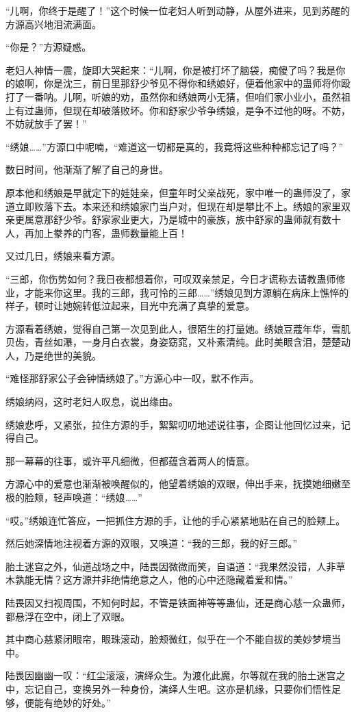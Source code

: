 \begin{this_body}
“儿啊，你终于是醒了！”这个时候一位老妇人听到动静，从屋外进来，见到苏醒的方源高兴地泪流满面。

“你是？”方源疑惑。

老妇人神情一震，旋即大哭起来：“儿啊，你是被打坏了脑袋，痴傻了吗？我是你的娘啊，你是沈三，前日里那舒少爷见不得你和绣娘好，便着他家中的蛊师将你殴打了一番呐。儿啊，听娘的劝，虽然你和绣娘两小无猜，但咱们家小业小，虽然祖上有过蛊师，但现在却破落败坏。你和舒家少爷争绣娘，是争不过他的呀。不妨，不妨就放手了罢！”

“绣娘……”方源口中呢喃，“难道这一切都是真的，我竟将这些种种都忘记了吗？”

数日时间，他渐渐了解了自己的身世。

原本他和绣娘是早就定下的娃娃亲，但童年时父亲战死，家中唯一的蛊师没了，家道立即败落下去。本来还和绣娘家门当户对，但现在却是攀比不上。绣娘的家里双亲更属意那舒少爷。舒家家业更大，乃是城中的豪族，族中舒家的蛊师就有数十人，再加上豢养的门客，蛊师数量能上百！

又过几日，绣娘来看方源。

“三郎，你伤势如何？我日夜都想着你，可叹双亲禁足，今日才谎称去请教蛊师修业，才能来你这里。我的三郎，我可怜的三郎……”绣娘见到方源躺在病床上憔悴的样子，顿时让她婉转低泣起来，目光中充满了真挚的爱意。

方源看着绣娘，觉得自己第一次见到此人，很陌生的打量她。绣娘豆蔻年华，雪肌贝齿，青丝如瀑，一身月白衣裳，身姿窈窕，又朴素清纯。此时美眼含泪，楚楚动人，乃是绝世的美貌。

“难怪那舒家公子会钟情绣娘了。”方源心中一叹，默不作声。

绣娘纳闷，这时老妇人叹息，说出缘由。

绣娘悲呼，又紧张，拉住方源的手，絮絮叨叨地述说往事，企图让他回忆过来，记得自己。

那一幕幕的往事，或许平凡细微，但都蕴含着两人的情意。

方源心中的爱意也渐渐被唤醒似的，他望着绣娘的双眼，伸出手来，抚摸她细嫩至极的脸颊，轻声唤道：“绣娘……”

“哎。”绣娘连忙答应，一把抓住方源的手，让他的手心紧紧地贴在自己的脸颊上。

然后她深情地注视着方源的双眼，又唤道：“我的三郎，我的好三郎。”

胎土迷宫之外，仙道战场之中，陆畏因微微而笑，自语道：“我果然没错，人非草木孰能无情？这方源并非绝情绝意之人，他的心中还隐藏着爱和情。”

陆畏因又扫视周围，不知何时起，不管是铁面神等等蛊仙，还是商心慈一众蛊师，都悬浮在空中，闭上了双眼。

其中商心慈紧闭眼帘，眼珠滚动，脸颊微红，似乎在一个不能自拔的美妙梦境当中。

陆畏因幽幽一叹：“红尘滚滚，演绎众生。为渡化此魔，尔等就在我的胎土迷宫之中，忘记自己，变换另外一种身份，演绎人生吧。这亦是机缘，只要你们悟性足够，便能有绝妙的好处。”

\end{this_body}

